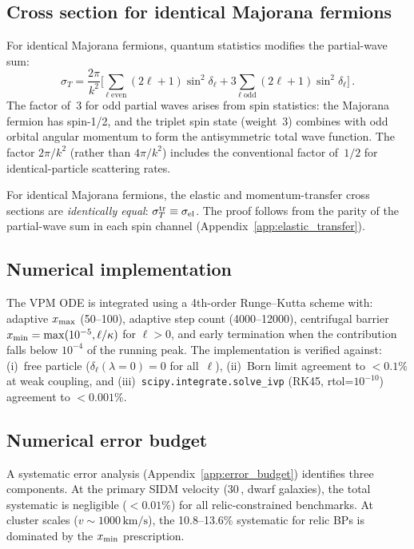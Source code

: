 \documentclass[aps,prd,twocolumn,superscriptaddress,nofootinbib]{revtex4-2}
\newcommand{\kms}{\,\text{km/s}}
\newcommand{\lam}{\lambda}
\begin{document}
\subsection{Cross section for identical Majorana fermions}
\label{sec:majorana_xs}

For identical Majorana fermions, quantum statistics modifies the
partial-wave sum:
\begin{equation}\label{eq:sigma_T}
  \sigma_T = \frac{2\pi}{k^{2}}\biggl[
    \sum_{\ell\;\text{even}}(2\ell+1)\sin^{2}\delta_\ell
    + 3\sum_{\ell\;\text{odd}}(2\ell+1)\sin^{2}\delta_\ell
  \biggr]\,.
\end{equation}
The factor of~3 for odd partial waves arises from spin statistics: the
Majorana fermion has spin-1/2, and the triplet spin state (weight~3)
combines with odd orbital angular momentum to form the antisymmetric
total wave function.  The factor $2\pi/k^{2}$ (rather than
$4\pi/k^{2}$) includes the conventional factor of~$1/2$ for
identical-particle scattering rates.

For identical Majorana fermions, the elastic and momentum-transfer
cross sections are \emph{identically equal}:
$\sigma_T^{\rm tr}\equiv\sigma_{\rm el}$.  The proof follows from the
parity of the partial-wave sum in each spin channel (Appendix~\ref{app:elastic_transfer}).

\subsection{Numerical implementation}\label{sec:numerics}

The VPM ODE is integrated using a 4th-order Runge--Kutta scheme with:
adaptive $x_{\rm max}$ (50--100), adaptive step count (4000--12000),
centrifugal barrier $x_{\rm min}=\max(10^{-5},\ell/\kappa)$ for
$\ell>0$, and early termination when the contribution falls below
$10^{-4}$ of the running peak.  The implementation is verified
against: (i)~free particle ($\delta_\ell(\lam=0)=0$ for all~$\ell$),
(ii)~Born limit agreement to $<0.1\%$ at weak coupling, and
(iii)~\texttt{scipy.integrate.solve\_ivp} (RK45, rtol=$10^{-10}$)
agreement to $<0.001\%$.

\subsection{Numerical error budget}\label{sec:error_budget}

A systematic error analysis (Appendix~\ref{app:error_budget})
identifies three components.  At the primary SIDM velocity
(30\kms, dwarf galaxies), the total systematic is negligible
($<0.01\%$) for all relic-constrained benchmarks.  At cluster scales
($v\sim 1000\kms$), the 10.8--13.6\% systematic for relic BPs is
dominated by the $x_{\rm min}$ prescription.
\end{document}
